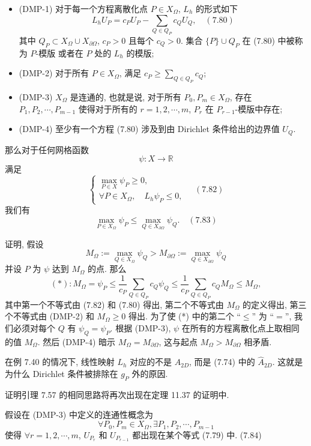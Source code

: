 \documentclass[a4paper]{ctexart}
\newcommand{\hl}[1]
{\noindent {\bf {#1}}}
\begin{document}
{\begin{itemize}
  \item (DMP-1) 对于每一个方程离散化点 $P \in X_{\Omega}$, $L_h$ 的形式如下
  $$
  L_h U_P = c_PU_P - \sum_{Q \in Q_P}c_QU_Q, \quad (7.80)
  $$
  其中 $Q_P \subset X_{\Omega} \cup X_{\partial\Omega}$, 
  $c_P > 0$ 且每个 $c_Q > 0$. 集合 $\{P\} \cup Q_P$ 在 (7.80) 
  中被称为 $P$-模版 或者在 $P$ 处的 $L_h$ 的模版;
  \item (DMP-2) 对于所有 $P \in X_{\Omega}$, 
  满足 $c_P \ge \sum_{Q \in Q_P} c_Q$;
  \item (DMP-3) $X_{\Omega}$ 是连通的, 也就是说, 
  对于所有 $P_0, P_m \in X_{\Omega}$, 
  存在 $P_1, P_2, \cdots, P_{m-1}$ 
  使得对于所有的 $r = 1, 2, \cdots , m$, $P_r$ 在 $P_{r - 1}$-模版中存在;
  \item (DMP-4) 至少有一个方程 (7.80) 涉及到由 Dirichlet 条件给出的边界值 $U_Q$.
\end{itemize}

那么对于任何网格函数 
$$
\psi : X \rightarrow \mathbb{R}
$$ 
满足
$$
\begin{cases}
\max_{P \in X}\psi_P \geq 0, \\
\forall P \in X_{\Omega}, \quad L_h\psi_P \leq 0,
\end{cases}
\quad (7.82)
$$
我们有
$$
\max_{P \in X_{\Omega}}\psi_P 
\leq \max_{Q \in X_{\partial\Omega}}\psi_Q. \quad (7.83)
$$

证明, 假设
$$
M_{\Omega} := \max_{Q \in X_{\Omega}}\psi_Q > M_{\partial\Omega} 
:= \max_{Q \in X_{\partial\Omega}}\psi_Q
$$
并设 $P$ 为 $\psi$ 达到 $M_{\Omega}$ 的点. 
那么
$$
(*): M_{\Omega} 
= \psi_P \leq \frac{1}{c_P}\sum_{Q \in Q_P}c_Q\psi_Q 
\leq \frac{1}{c_P}\sum_{Q \in Q_P}c_QM_{\Omega} \leq M_{\Omega},
$$
其中第一个不等式由 (7.82) 和 (7.80) 得出, 第二个不等式由 $M_{\Omega}$ 的定义得出, 
第三个不等式由 (DMP-2) 和 $M_{\Omega} \geq 0$ 得出. 
为了使 (*) 中的第二个 ``$\leq$'' 为 ``$=$'', 
我们必须对每个 $Q$ 有 $\psi_Q = \psi_P$. 
根据 (DMP-3), $\psi$ 在所有的方程离散化点上取相同的值 $M_{\Omega}$. 
然后 (DMP-4) 暗示 $M_{\Omega} = M_{\partial\Omega}$, 
这与起点 $M_{\Omega} > M_{\partial\Omega}$ 相矛盾.   

在例 7.40 的情况下, 线性映射 $L_h$ 对应的不是 $A_{2D}$, 
而是 (7.74) 中的 $\hat{A}_{2D}$. 
这就是为什么 Dirichlet 条件被排除在 $g_P$ 外的原因.

证明引理 7.57 的相同思路将再次出现在定理 11.37 的证明中.

\hl{例 7.58} 假设在 (DMP-3) 中定义的连通性概念为
$$
\forall P_0, P_m \in X_{\Omega}, 
\exists P_1, P_2, \cdots , P_{m-1}
$$ 
使得 $\forall r = 1, 2, \cdots, m$,
$U_{P_r}$ 和 $U_{P_{r-1}}$ 都出现在某个等式 (7.79) 中. (7.84)

}
\end{document}
